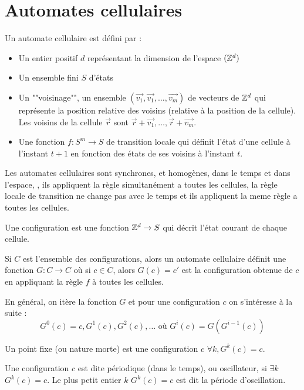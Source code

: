 \section{Automates cellulaires}

\begin{definition}
	Un automate cellulaire est défini par :
	\begin{itemize}
		\item Un entier positif $d$ représentant la dimension de l'espace $(\mathbb{Z}^d)$
		\item Un ensemble fini $S$ d'états
		\item Un ""voisinage"", \ie un ensemble $(\vec{v_1},  \vec{v_1}, \ldots ,\vec{v_m})$ de vecteurs de $\mathbb{Z}^d$
		      qui représente la position relative des voisins (relative à la position de la cellule). Les voisins de la
		      cellule $\vec r$ sont $\vec r + \vec {v_1},  \ldots , \vec r + \vec {v_m}$.
		\item Une fonction $f : S ^ m \to S$ de transition locale qui définit l'état d'une cellule à l'instant $t + 1$
		      en fonction des états de ses voisins à l'instant $t$.
	\end{itemize}
\end{definition}

Les automates cellulaires sont synchrones, et homogènes, dans le temps et dans l'espace, \ie,
ils appliquent la règle simultanément a toutes les cellules,
la règle locale de transition ne change pas avec le temps et
ils appliquent la meme règle a toutes les cellules.

\begin{definition}
	Une configuration est une fonction $\mathbb{Z} ^ d \to S$ qui décrit l'état courant de chaque cellule.

	Si $C$ est l'ensemble des configurations, alors un automate cellulaire définit une fonction $G: C \to C$ où si $c \in C$, alors
	$G(c) = c'$ est la configuration obtenue de $c$ en appliquant la règle $f$ à toutes les cellules.

	En général, on itère la fonction $G$ et pour une configuration $c$ on s'intéresse à la suite :
	$$ G^0 (c) = c, G^1 (c), G^2 (c), \ldots \text{ où } G^i (c) = G ( G^{i - 1 }(c))$$
\end{definition}

\begin{definition}
	Un point fixe (ou nature morte) est une configuration $c$ \tlq $\forall k, G^k(c) = c$.
\end{definition}


\begin{definition}
	Une configuration $c$ est dite périodique (dans le temps), ou oscillateur, si $\exists k$ \tq $G^k(c) = c$. Le plus petit
	entier $k$ \tq $G^k(c) = c$ est dit la période d'oscillation.
\end{definition}

